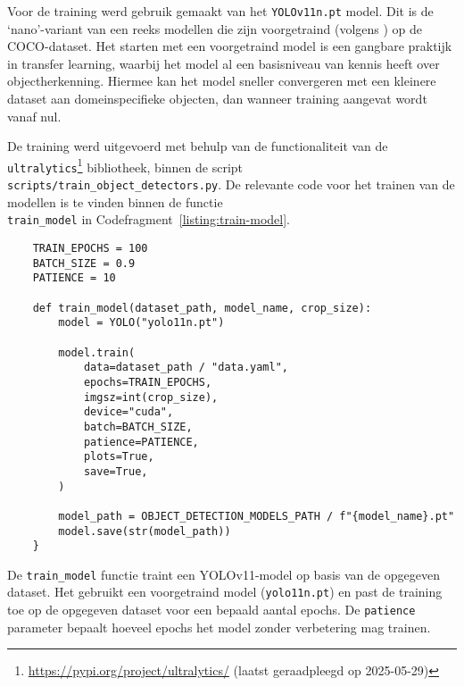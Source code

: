 Voor de training werd gebruik gemaakt van het \texttt{YOLOv11n.pt} model. 
Dit is de `nano'-variant van een reeks modellen die zijn voorgetraind (volgens \textcite{Khanam2024}) op de COCO-dataset.
Het starten met een voorgetraind model is een gangbare praktijk in transfer learning, waarbij het model 
al een basisniveau van kennis heeft over objectherkenning.
Hiermee kan het model sneller convergeren met een kleinere dataset aan domeinspecifieke objecten, dan wanneer training aangevat wordt vanaf nul.

De training werd uitgevoerd met behulp van de functionaliteit van de \texttt{ultralytics}\footnote{\url{https://pypi.org/project/ultralytics/} (laatst geraadpleegd op 2025-05-29)} bibliotheek, 
binnen de script \texttt{scripts/train\_object\_detectors.py}.
De relevante code voor het trainen van de modellen is te vinden binnen de functie\\ \texttt{train\_model} in Codefragment~\ref{listing:train-model}.

\begin{listing}[H]
  \begin{verbatim}
    TRAIN_EPOCHS = 100
    BATCH_SIZE = 0.9
    PATIENCE = 10

    def train_model(dataset_path, model_name, crop_size):
        model = YOLO("yolo11n.pt")

        model.train(
            data=dataset_path / "data.yaml",
            epochs=TRAIN_EPOCHS,
            imgsz=int(crop_size),
            device="cuda",
            batch=BATCH_SIZE,
            patience=PATIENCE,
            plots=True,
            save=True,
        )

        model_path = OBJECT_DETECTION_MODELS_PATH / f"{model_name}.pt"
        model.save(str(model_path))
    }
  \end{verbatim}
  \caption[Functie voor het trainen van YOLOv11-modellen]{
    \label{listing:train-model}
    De \texttt{train\_model} functie traint een YOLOv11-model op basis van de opgegeven dataset.
    Het gebruikt een voorgetraind model (\texttt{yolo11n.pt}) en past de training toe op de opgegeven dataset voor een bepaald aantal epochs.
    De \texttt{patience} parameter bepaalt hoeveel epochs het model zonder verbetering mag trainen.
  }
\end{listing}

